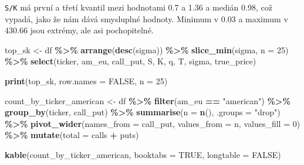 \documentclass[
]{article}
\newenvironment{Shaded}{\begin{snugshade}}{\end{snugshade}}
\newcommand{\AttributeTok}[1]{\textcolor[rgb]{0.13,0.29,0.53}{#1}}
\newcommand{\ConstantTok}[1]{\textcolor[rgb]{0.56,0.35,0.01}{#1}}
\newcommand{\DecValTok}[1]{\textcolor[rgb]{0.00,0.00,0.81}{#1}}
\newcommand{\FunctionTok}[1]{\textcolor[rgb]{0.13,0.29,0.53}{\textbf{#1}}}
\newcommand{\NormalTok}[1]{#1}
\newcommand{\OtherTok}[1]{\textcolor[rgb]{0.56,0.35,0.01}{#1}}
\newcommand{\SpecialCharTok}[1]{\textcolor[rgb]{0.81,0.36,0.00}{\textbf{#1}}}
\newcommand{\StringTok}[1]{\textcolor[rgb]{0.31,0.60,0.02}{#1}}
\begin{document}
\texttt{S/K} má první a třetí kvantil mezi hodnotami 0.7 a 1.36 a medián
0.98, což vypadá, jako že nám dává smysluplné hodnoty. Minimum v 0.03 a
maximum v 430.66 jsou extrémy, ale asi pochopitelné.

\begin{Shaded}
\begin{Highlighting}[]
\NormalTok{top\_sk }\OtherTok{\textless{}{-}}\NormalTok{ df }\SpecialCharTok{\%\textgreater{}\%}
  \FunctionTok{arrange}\NormalTok{(}\FunctionTok{desc}\NormalTok{(sigma)) }\SpecialCharTok{\%\textgreater{}\%}
  \FunctionTok{slice\_min}\NormalTok{(sigma, }\AttributeTok{n =} \DecValTok{25}\NormalTok{) }\SpecialCharTok{\%\textgreater{}\%}
  \FunctionTok{select}\NormalTok{(ticker, am\_eu, call\_put, S, K, q, T, sigma, true\_price)}

\FunctionTok{print}\NormalTok{(top\_sk, }\AttributeTok{row.names =} \ConstantTok{FALSE}\NormalTok{, }\AttributeTok{n =} \DecValTok{25}\NormalTok{)}
\end{Highlighting}
\end{Shaded}

\begin{Shaded}
\begin{Highlighting}[]
\NormalTok{count\_by\_ticker\_american }\OtherTok{\textless{}{-}}\NormalTok{ df }\SpecialCharTok{\%\textgreater{}\%}
  \FunctionTok{filter}\NormalTok{(am\_eu }\SpecialCharTok{==} \StringTok{"american"}\NormalTok{) }\SpecialCharTok{\%\textgreater{}\%}
  \FunctionTok{group\_by}\NormalTok{(ticker, call\_put) }\SpecialCharTok{\%\textgreater{}\%}
  \FunctionTok{summarise}\NormalTok{(}\AttributeTok{n =} \FunctionTok{n}\NormalTok{(), }\AttributeTok{.groups =} \StringTok{"drop"}\NormalTok{) }\SpecialCharTok{\%\textgreater{}\%}
  \FunctionTok{pivot\_wider}\NormalTok{(}\AttributeTok{names\_from =}\NormalTok{ call\_put, }\AttributeTok{values\_from =}\NormalTok{ n, }\AttributeTok{values\_fill =} \DecValTok{0}\NormalTok{) }\SpecialCharTok{\%\textgreater{}\%}
  \FunctionTok{mutate}\NormalTok{(}\AttributeTok{total =}\NormalTok{ calls }\SpecialCharTok{+}\NormalTok{ puts)}

\FunctionTok{kable}\NormalTok{(count\_by\_ticker\_american, }\AttributeTok{booktabs =} \ConstantTok{TRUE}\NormalTok{, }\AttributeTok{longtable =} \ConstantTok{FALSE}\NormalTok{)}
\end{Highlighting}
\end{Shaded}
\end{document}
